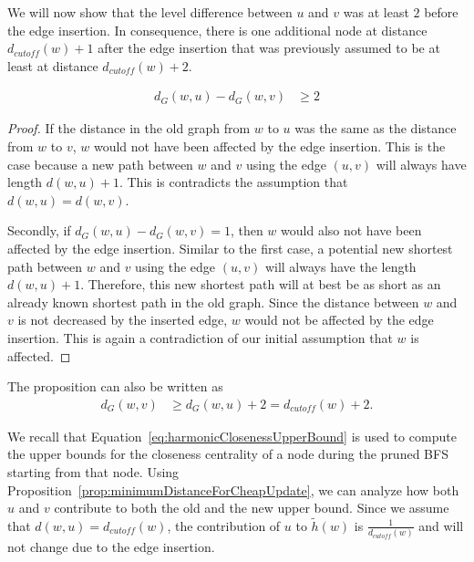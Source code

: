 We will now show that the level difference between $u$ and $v$ was at least $2$ before the edge insertion. In consequence, there is one additional node at distance $d_{cutoff}(w) + 1$ after the edge insertion that was previously assumed to be at least at distance $d_{cutoff}(w) + 2$.

\begin{proposition}
\label{prop:minimumDistanceForCheapUpdate}
	\begin{align*}
	 	d_G(w, u) - d_G(w, v) &\geq 2
	\end{align*}
\end{proposition}
\begin{proof}
If the distance in the old graph from $w$ to $u$ was the same as the distance from $w$ to $v$, $w$ would not have been affected by the edge insertion. This is the case because a new path between $w$ and $v$ using the edge $(u, v)$ will always have length $d(w, u) + 1$. This is contradicts the assumption that $d(w, u) = d(w, v)$.

Secondly, if $d_G(w, u) - d_G(w, v) = 1$, then $w$ would also not have been affected by the edge insertion. Similar to the first case, a potential new shortest path between $w$ and $v$ using the edge $(u, v)$ will always have the length $d(w, u) + 1$. Therefore, this new shortest path will at best be as short as an already known shortest path in the old graph. Since the distance between $w$ and $v$ is not decreased by the inserted edge, $w$ would not be affected by the edge insertion. This is again a contradiction of our initial assumption that $w$ is affected.
\end{proof}

The proposition can also be written as
\begin{align}
	d_G(w, v) &\geq d_G(w, u) + 2 = d_{cutoff}(w) + 2.
\end{align}

We recall that Equation~\ref{eq:harmonicClosenessUpperBound} is used to compute the upper bounds for the closeness centrality of a node during the pruned BFS starting from that node. Using Proposition~\ref{prop:minimumDistanceForCheapUpdate}, we can analyze how both $u$ and $v$ contribute to both the old and the new upper bound. Since we assume that $d(w, u) = d_{cutoff}(w)$, the contribution of $u$ to $\widetilde{h}(w)$ is $\frac{1}{d_{cutoff}(w)}$ and will not change due to the edge insertion.

